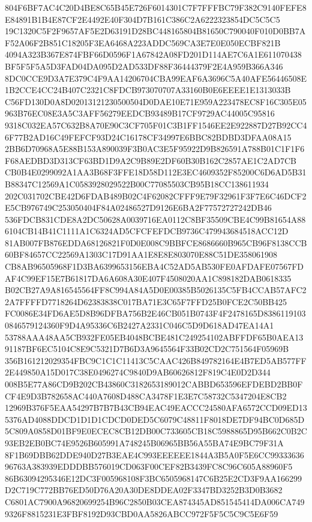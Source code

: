 \documentclass[UTF8,fontset=fandol,zihao=-4,a4paper]{ctexart}
\begin{document}
{{804F6BF7AC4C20D4BE8C65B45E726F6014301C7F7FFFBC79F382C9140FEFE8E84891B1B4E87CF2E4492E40F304D7B161C386C2A6222323854DC5C5C5
19C1320C5F2F9657AF5E2D63191D28BC448165804B81650C790040F010D0BB7AF52A06F2B851C18205F3EA6468A223ADDC569CA3E7E0E050ECBF821B
4094A323B367E874FBF66D0596F1A67842A08FD201D114AE7C6A1E611070438BF5F5F5A5D3FAD04DA095D2AD533DF88F36444379F2E4A959B366A346
8DC0CCE9D3A7E379C4F9AA14206704CBA99EAF6A3696C5A40AFE56446508E1B2CCE4CC24B407C2321C8FDCB973070707A33160B0E6EEEE1E1313033B
C56FD130D0A8D02013121230500504D0DAE10E71E959A223478EC8F16C305E05963B76EC08E3A5C3AFF56279EEDCB93489B17CF9729AC44005C95816
9318C032EA57C632B8A70E90C3CF705F01C3B1FF1546EE2E922887D27B92CC46F77B2AD16C49FEFCF93D24C16178CF34997E6BBC82BDBD3DFAA08A15
2BB6D70968A5E88B153A890039F3B0AC3E5F95922D9B826591A788B01C1F1F6F68AEDBD3D313CF63BD1D9A2C9B89E2DF60B30B162C2857AE1C2AD7CB
CB0B4E0299092A1AA3B68F3FFE18D58D112E3EC4609352F85200C6D6AD5B31B88347C12569A1C0583928029522B00C77085503CB95B18CC138611934
202C031702CBE42D6FDAB489B02C4F62082CFFF9E79F32961F3F7E6C46DCF2E5CB976749C253050404F84A02486527D9126E6BA2F77572727242DB46
536FDCB831CDE8A2DC50628A0039716EA0112C8BF35509CBE4C99B81654A886104CB14B41C1111A1C6324AD5CFCFEFDCB9736C479943684518ACC12D
81AB007FB876EDDA68126821F0D0E008C9BBFCE8686660B965CB96F8138CCB60BF84657CC22569A1303C17D91AA1E8E8E803070E88C51DE358061908
CB8AB96505968F1D3BA6399653156EBA4C52AD5AB530FE0AFDAFE07567FDAF4C99EF15E7B61817DA6A608A30E407F4508020AA1C898182DAB0618335
B02CB27A9A816545564FF8C994A84A5D0E00385B5026135C5FB4CCAB57AFC22A7FFFFD7718264D62383838C017BA71E3C65F7FFD25B0FCE2C50BB425
FC0086E34FD6AE5D8B96DFBA756B2E46CB051B0743F4F2478165D83861191030846579124360F9D4A95336C6B2427A2331C046C5D9D618AD47EA14A1
53788AAA48AA5CB932FE05EB4048BCBE481C249254102ABFFDF65B0AEA1391187BF6EC5104C8E9C5321D7B6D3A9645564F33B02CD2C751564F05969B
356B161212029354FBC9C1C1C11413C5CAAC426B849782164E4B7ED5AB577FF2E449850A15D017C38E0496274C9840D9AB60626812F819C4E0D2D344
008B5E77A86CD9B202CB43860C3182653189012CABBD653596EFDEBD2BB0FCF4E9D3B782658AC440A7608D488CA3478F1E3E7C58732C5347204E8CB2
12969B376F5EAA54297B7B7B43CB94EAC49EACCC24580AFA6572CCD09ED135376AD4088DDCD1D1D1CDCD0DED5C6079C48811F8018DE7DF94BC0D685D
5C809A0858D01BF9E0ECEC8CB12DB00C733605CB18C5988865D95B662C0B2C93EB2EB0BC74E9526B605991A748245B06965BB56A55BA74E9BC79F31A
8F1B69DBB62DDE940D27B3EAE4C993EEEEEE1844A3B5A0F5E6CC9933363696763A383939EDDDBB576019CD063F00CEF82B3439FC8C96C605A88960F5
86B63094295346E12DC3F005968108F3BC6505968147C6B25E2CD3F9AA166299D2C719C772BB76ED50D76A20A30DE8DDEA02F3347BD3252B3D0B3682
C6801AC7900A96820699254B96C2850B03CEA874345AD851545414DA006CA7499326F8815231E3FBF8192D93CBD0AA5826ABCC972F5F5C5C9C5E6F59
}}
\end{document}
